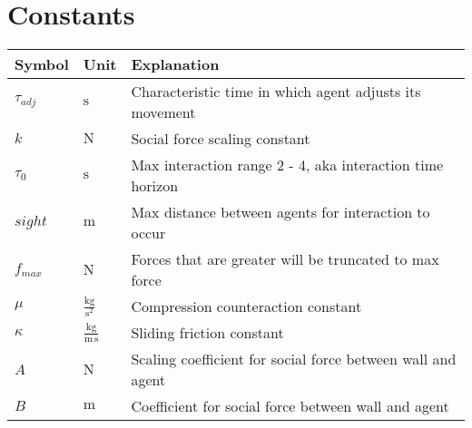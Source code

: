 \section{Constants}

\begin{tabular}{lll}
Symbol         & Unit &  Explanation \\
\hline
$ \tau_{adj} $ & $ \mathrm{s} $ & Characteristic time in which agent adjusts its movement \\
$ k $          & $ \mathrm{N} $ & Social force scaling constant \\
$ \tau_{0} $   & $ \mathrm{s} $ & Max interaction range 2 - 4, aka interaction time horizon \\
$ sight $      & $ \mathrm{m} $ & Max distance between agents for interaction to occur \\
$ f_{max} $    & $ \mathrm{N} $ & Forces that are greater will be truncated to max force \\
$ \mu $        & $ \mathrm{\frac{kg}{s^{2}}} $ & Compression counteraction constant \\
$ \kappa $     & $ \mathrm{\frac{kg}{m\,s}} $ & Sliding friction constant \\
$ A $          & $ \mathrm{N} $ & Scaling coefficient for social force between wall and agent \\
$ B $          & $ \mathrm{m} $ & Coefficient for social force between wall and agent \\
\end{tabular} 
\newline

